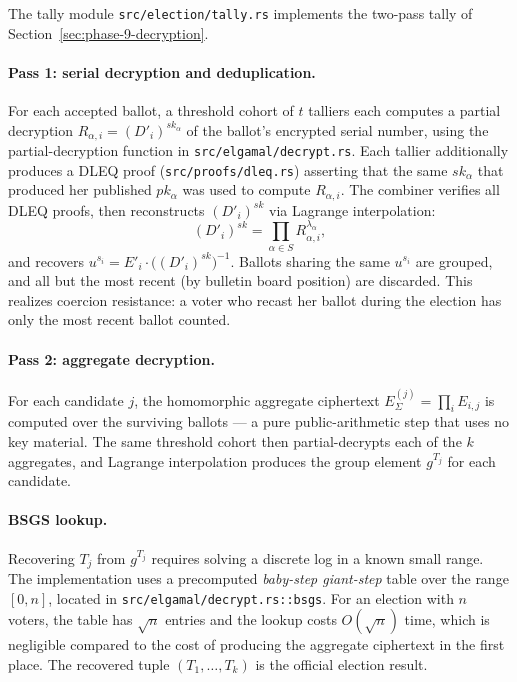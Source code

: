 \documentclass[12pt,a4paper,oneside]{report}
\begin{document}
The tally module \texttt{src/election/tally.rs} implements the two-pass 
tally of Section~\ref{sec:phase-9-decryption}.

\paragraph{Pass 1: serial decryption and deduplication.}
For each accepted ballot, a threshold cohort of $t$ talliers each 
computes a partial decryption $R_{\alpha, i} = (D'_i)^{sk_\alpha}$ of 
the ballot's encrypted serial number, using the partial-decryption 
function in \texttt{src/elgamal/decrypt.rs}. Each tallier additionally 
produces a DLEQ proof (\texttt{src/proofs/dleq.rs}) asserting that the 
same $sk_\alpha$ that produced her published $pk_\alpha$ was used to 
compute $R_{\alpha, i}$. The combiner verifies all DLEQ proofs, then 
reconstructs $(D'_i)^{sk}$ via Lagrange interpolation:
\[
    (D'_i)^{sk} = \prod_{\alpha \in S} R_{\alpha, i}^{\lambda_\alpha},
\]
and recovers $u^{s_i} = E'_i \cdot \big((D'_i)^{sk}\big)^{-1}$. Ballots 
sharing the same $u^{s_i}$ are grouped, and all but the most recent 
(by bulletin board position) are discarded. This realizes coercion 
resistance: a voter who recast her ballot during the election has only 
the most recent ballot counted.

\paragraph{Pass 2: aggregate decryption.}
For each candidate $j$, the homomorphic aggregate ciphertext 
$E_\Sigma^{(j)} = \prod_i E_{i, j}$ is computed over the surviving 
ballots --- a pure public-arithmetic step that uses no key material. 
The same threshold cohort then partial-decrypts each of the $k$ 
aggregates, and Lagrange interpolation produces the group element 
$g^{T_j}$ for each candidate.

\paragraph{BSGS lookup.}
Recovering $T_j$ from $g^{T_j}$ requires solving a discrete log in a 
known small range. The implementation uses a precomputed 
\emph{baby-step giant-step} table over the range $[0, n]$, located in 
\texttt{src/elgamal/decrypt.rs::bsgs}. For an election with $n$ voters, 
the table has $\sqrt{n}$ entries and the lookup costs $O(\sqrt{n})$ time, 
which is negligible compared to the cost of producing the aggregate 
ciphertext in the first place. The recovered tuple 
$(T_1, \ldots, T_k)$ is the official election result.
\end{document}
